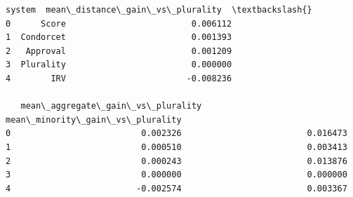 \documentclass[11pt]{article}
\makeatletter
\newcommand{\boxspacing}{\kern\kvtcb@left@rule\kern\kvtcb@boxsep}
\newcommand{\prompt}[4]{
        {\ttfamily\llap{{\color{#2}[#3]:\hspace{3pt}#4}}\vspace{-\baselineskip}}
    }
\makeatother
\begin{document}
            \begin{tcolorbox}[breakable, size=fbox, boxrule=.5pt, pad at break*=1mm, opacityfill=0]
\prompt{Out}{outcolor}{110}{\boxspacing}
\begin{Verbatim}[commandchars=\\\{\}]
      system  mean\_distance\_gain\_vs\_plurality  \textbackslash{}
0      Score                         0.006112
1  Condorcet                         0.001393
2   Approval                         0.001209
3  Plurality                         0.000000
4        IRV                        -0.008236

   mean\_aggregate\_gain\_vs\_plurality  mean\_minority\_gain\_vs\_plurality
0                          0.002326                         0.016473
1                          0.000510                         0.003413
2                          0.000243                         0.013876
3                          0.000000                         0.000000
4                         -0.002574                         0.003367
\end{Verbatim}
\end{tcolorbox}
        
\end{document}
